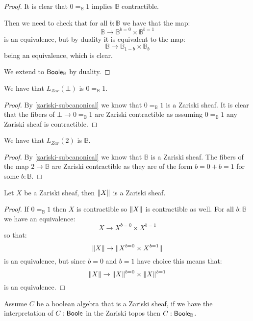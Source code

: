 \begin{proof}
It is clear that $0=_\mathbb{B}1$ implies $\mathbb{B}$ contractible.

Then we need to check that for all $b:\mathbb{B}$ we have that the map:
\[\mathbb{B} \to \mathbb{B}^{b=0}\times\mathbb{B}^{b=1}\]
is an equivalence, but by duality it is equivalent to the map:
\[\mathbb{B} \to \mathbb{B}_{1-b}\times\mathbb{B}_b\]
being an equivalence, which is clear.

We extend to $\mathsf{Boole}_{\mathbb{B}}$ by duality.
\end{proof}

\begin{lemma}\label{bot-zariski}
We have that $L_{Zar}(\bot)$ is $0=_\mathbb{B}1$.
\end{lemma}

\begin{proof}
By \cref{zariski-subcanonical} we know that $0=_\mathbb{B}1$ is a Zariski sheaf. It is clear that the fibers of $\bot\to 0=_\mathbb{B}1$ are Zariski contractible as assuming $0=_\mathbb{B}1$ any Zariski sheaf is contractible.
\end{proof}

\begin{lemma}\label{bool-zariski}
We have that $L_{Zar}({2})$ is $\mathbb{B}$.
\end{lemma}

\begin{proof}
By \cref{zariski-subcanonical} we know that $\mathbb{B}$ is a Zariski sheaf. The fibers of the map ${2}\to\mathbb{B}$ are Zariski contractible as they are of the form $b=0+b=1$ for some $b:\mathbb{B}$.
\end{proof}

\begin{lemma}\label{truncation-zariski}
Let $X$ be a Zariski sheaf, then $\lVert X \rVert$ is a Zariski sheaf.
\end{lemma}

\begin{proof}
If $0=_\mathbb{B}1$ then $X$ is contractible so $\lVert X \rVert$ is contractible as well. For all $b:\mathbb{B}$ we have an equivalence:
\[X\to X^{b=0}\times X^{b=1}\]
so that:
\[\lVert X \rVert\to \lVert X^{b=0}\times X^{b=1} \rVert\]
is an equivalence, but since $b=0$ and $b=1$ have choice this means that:
\[\lVert X \rVert\to \lVert X \rVert^{b=0}\times \lVert X \rVert^{b=1}\]
is an equivalence.
\end{proof}

\begin{lemma}\label{zariski-cp-iff-cp}
Assume $C$ be a boolean algebra that is a Zariski sheaf, if we have the interpretation of $C:\mathsf{Boole}$ in the Zariski topos then $C:\mathsf{Boole}_\mathbb{B}$.
\end{lemma}

